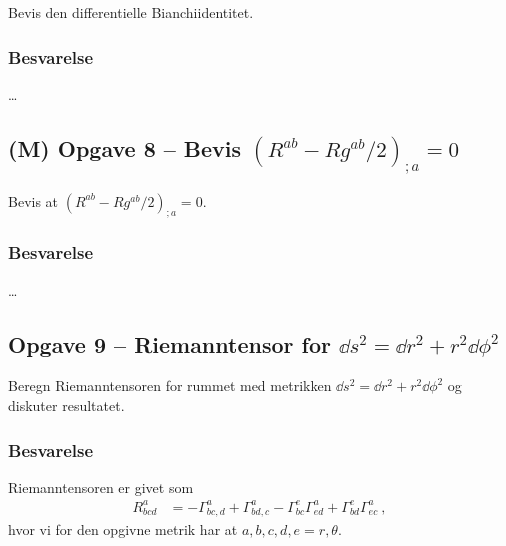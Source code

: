 \documentclass[../main.tex]{subfiles}
\begin{document}
Bevis den differentielle Bianchiidentitet.


\subsubsection{Besvarelse}

\ldots




\subsection{(M) Opgave 8 -- Bevis $(R^{ab} - Rg^{ab}/2)_{;a} = 0$}
\setcounter{subsection}{8}
\setcounter{equation}{0}

Bevis at $(R^{ab} - Rg^{ab}/2)_{;a} = 0$.


\subsubsection{Besvarelse}

\ldots




\subsection{Opgave 9 -- Riemanntensor for $\dd s^2 = \dd r^2 + r^2 \dd \phi^2$}
\setcounter{subsection}{9}
\setcounter{equation}{0}

Beregn Riemanntensoren for rummet med metrikken $\dd s^2 = \dd r^2 + r^2 \dd \phi^2$ og diskuter resultatet.


\subsubsection{Besvarelse}

Riemanntensoren er givet som
\begin{align}
    R^a_{bcd} &= - \Gamma^a_{bc,d} + \Gamma^a_{bd,c} - \Gamma^e_{bc} \Gamma^a_{ed} + \Gamma^e_{bd} \Gamma^a_{ec} \: ,
\end{align}
hvor vi for den opgivne metrik har at $a,b,c,d,e=r,\theta$.
\end{document}
